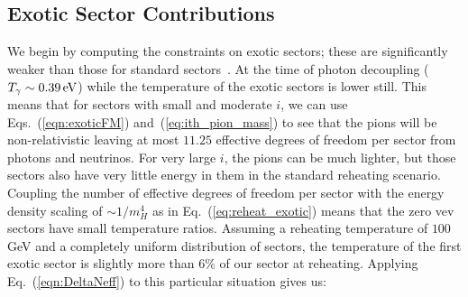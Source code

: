 \documentclass[nofootinbib,twocolumn,preprintnumbers]{revtex4-1}
\begin{document}
\subsection{Exotic Sector Contributions}
We begin by computing the constraints on exotic sectors; these are significantly weaker than those for standard sectors~\cite{Arkani-Hamed:2016rle}. 
At the time of photon decoupling ($T_\gamma \sim 0.39 \,{\rm eV}$) while the temperature of the exotic sectors is lower still. This means that for sectors with small and moderate $i$, we can use Eqs.~(\ref{eqn:exoticFM}) and~(\ref{eq:ith_pion_mass}) to see that the pions will be non-relativistic  leaving at most $11.25$ effective degrees of freedom per sector from photons and neutrinos.  For very large $i$, the pions can be much lighter, but those sectors also have very little energy in them in the standard reheating scenario. 
Coupling the number of effective degrees of freedom per sector with the energy density scaling of $\sim 1/m_H^4$ as in Eq.~(\ref{eq:reheat_exotic}) means that the zero vev sectors have small temperature ratios. Assuming a reheating temperature of $100$ GeV and a completely uniform distribution of sectors, the temperature of the first exotic sector is slightly more than $6\%$ of our sector at reheating. Applying Eq.~(\ref{eqn:DeltaNeff}) to this particular situation gives us:
\end{document}

